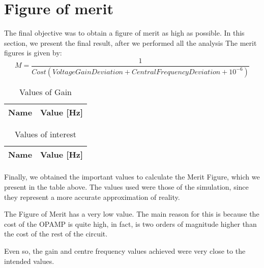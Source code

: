 \section{Figure of merit}
\label{sec:results}

The final objective was to obtain a figure of merit as high as possible. 
In this section, we present the final result, after we performed all the analysis
The merit figures is given by:
\begin{equation}
    M = \frac{1}{Cost (VoltageGainDeviation + CentralFrequencyDeviation + 10^{-6})}  
\end{equation}



\begin{table}[H]
  \centering
  \begin{tabular}{|l|r|}
    \hline    
    {\bf Name} & {\bf Value [Hz] } \\ \hline
    
  \end{tabular}
  \caption{Values of Gain}
  \label{tab:r}
\end{table}

\begin{table}[H]
  \centering
  \begin{tabular}{|l|r|}
    \hline    
    {\bf Name} & {\bf Value [Hz] } \\ \hline
    
  \end{tabular}
  \caption{Values of interest}
  \label{tab:r}
\end{table}

\paragraph{}

Finally, we obtained the important values to calculate the Merit Figure, which we present in the table above. The values used were those of the simulation, since they represent a more accurate approximation of reality.

The Figure of Merit has a very low value. The main reason for this is because the cost of the OPAMP is quite high, in fact, is two orders of magnitude higher than the cost of the rest of the circuit.

Even so, the gain and centre frequency values achieved were very close to the intended values. 
